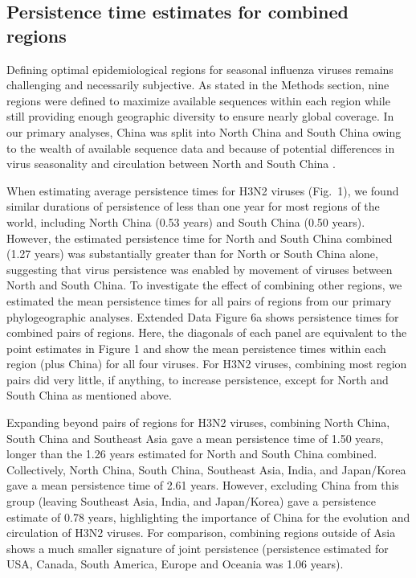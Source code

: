 \documentclass[11pt,oneside,letterpaper]{article}
\begin{document}
\subsection*{Persistence time estimates for combined regions}

Defining optimal epidemiological regions for seasonal influenza viruses remains challenging and necessarily subjective.
As stated in the Methods section, nine regions were defined to maximize available sequences within each region while still providing enough geographic diversity to ensure nearly global coverage.
In our primary analyses, China was split into North China and South China owing to the wealth of available sequence data and because of potential differences in virus seasonality and circulation between North and South China \cite{Yu13}.

When estimating average persistence times for H3N2 viruses (Fig.~1), we found similar durations of persistence of less than one year for most regions of the world, including North China (0.53 years) and South China (0.50 years).
However, the estimated persistence time for North and South China combined (1.27 years) was substantially greater than for North or South China alone, suggesting that virus persistence was enabled by movement of viruses between North and South China.
To investigate the effect of combining other regions, we estimated the mean persistence times for all pairs of regions from our primary phylogeographic analyses.
Extended Data Figure 6a shows persistence times for combined pairs of regions.
Here, the diagonals of each panel are equivalent to the point estimates in Figure 1 and show the mean persistence times within each region (plus China) for all four viruses.
For H3N2 viruses, combining most region pairs did very little, if anything, to increase persistence, except for North and South China as mentioned above.

Expanding beyond pairs of regions for H3N2 viruses, combining North China, South China and Southeast Asia gave a mean persistence time of 1.50 years, longer than the 1.26 years estimated for North and South China combined.
Collectively, North China, South China, Southeast Asia, India, and Japan/Korea gave a mean persistence time of 2.61 years.
However, excluding China from this group (leaving Southeast Asia, India, and Japan/Korea) gave a persistence estimate of 0.78 years, highlighting the importance of China for the evolution and circulation of H3N2 viruses.
For comparison, combining regions outside of Asia shows a much smaller signature of joint persistence (persistence estimated for USA, Canada, South America, Europe and Oceania was 1.06 years).
\end{document}
